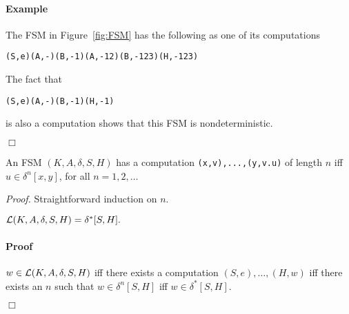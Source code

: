 \documentclass[preprint,11pt]{elsarticle}
\begin{document}
\paragraph{Example}
The FSM in Figure~\ref{fig:FSM}
has the following as one of its computations
\begin{center}
\begin{minipage}{3in}
\begin{verbatim}
(S,e)(A,-)(B,-1)(A,-12)(B,-123)(H,-123)
\end{verbatim}
\end{minipage}
\end{center}
The fact that 
\begin{center}
\begin{minipage}{3in}
\begin{verbatim}
(S,e)(A,-)(B,-1)(H,-1)
\end{verbatim}
\end{minipage}
\end{center}
is also a computation shows that this FSM
is nondeterministic.\\[-9mm]
\begin{flushright}$\Box$\end{flushright}

\begin{lemma}
An FSM $(K,A,\delta,S,H)$
has a computation \verb"(x,v),...,(y,v.u)"
of length $n$ iff $u\in \delta^n[x,y]$,
for all $n = 1,2,\ldots$
\end{lemma}
\emph{Proof.} Straightforward induction on $n$.\\[0mm]
\begin{theorem}
$\mathcal{L}(K,A,\delta,S,H) = \delta^*[S,H].$
\end{theorem}
\paragraph{Proof}
$w \in \mathcal{L}(K,A,\delta,S,H)$
iff
there exists a computation
$(S,e),\ldots,(H,w)$
iff
there exists an $n$ such that
$w \in \delta^n[S,H]$
iff
$w \in \delta^*[S,H].$\\[-0.9cm]
\begin{flushright}$\Box$\end{flushright}
\end{document}
